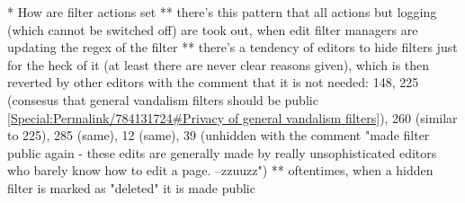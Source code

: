 * How are filter actions set
  ** there's this pattern that all actions but logging (which cannot be switched off) are took out, when edit filter managers are updating the regex of the filter
  ** there's a tendency of editors to hide filters just for the heck of it (at least there are never clear reasons given), which is then reverted by other editors with the comment that it is not needed: 148, 225 (consesus that general vandalism filters should be public \url{[Special:Permalink/784131724#Privacy of general vandalism filters]}), 260 (similar to 225), 285 (same), 12 (same), 39 (unhidden with the comment "made filter public again - these edits are generally made by really unsophisticated editors who barely know how to edit a page. --zzuuzz")
  ** oftentimes, when a hidden filter is marked as "deleted" it is made public


